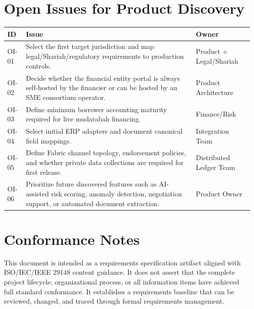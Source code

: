 \documentclass[11pt,a4paper]{article}
\begin{document}
\section{Open Issues for Product Discovery}
\begin{longtable}{@{}p{}p{}p{}@{}}
\rowcolor{gray!18}\textbf{ID} & \textbf{Issue} & \textbf{Owner} \\ \hline
OI-01 & Select the first target jurisdiction and map legal/Shariah/regulatory requirements to production controls. & Product + Legal/Shariah \\ \hline
OI-02 & Decide whether the financial entity portal is always self-hosted by the financier or can be hosted by an SME consortium operator. & Product Architecture \\ \hline
OI-03 & Define minimum borrower accounting maturity required for live mudarabah financing. & Finance/Risk \\ \hline
OI-04 & Select initial ERP adapters and document canonical field mappings. & Integration Team \\ \hline
OI-05 & Define Fabric channel topology, endorsement policies, and whether private data collections are required for first release. & Distributed Ledger Team \\ \hline
OI-06 & Prioritize future discovered features such as AI-assisted risk scoring, anomaly detection, negotiation support, or automated document extraction. & Product Owner \\ \hline
\end{longtable}

\section{Conformance Notes}
This document is intended as a requirements specification artifact aligned with ISO/IEC/IEEE 29148 content guidance. It does not assert that the complete project lifecycle, organizational process, or all information items have achieved full standard conformance. It establishes a requirements baseline that can be reviewed, changed, and traced through formal requirements management.
\end{document}
